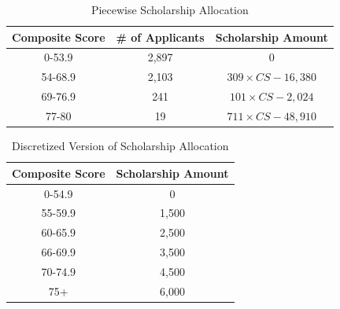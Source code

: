 \documentclass[12pt,english]{report}
\begin{document}
\begin{table}[ht]
\centering
\begin{tabular}{|c|c|c|}
\hline
Composite Score & \# of Applicants & Scholarship Amount \\ \hline
0-53.9         & 2,897	&0              \\ \hline
54-68.9        & 2,103  &$309\times CS -16,380 $            \\ \hline
69-76.9        &  241 &  $101\times CS - 2,024$           \\ \hline
77-80       & 19 &   $711 \times CS -48,910$          \\ \hline
\end{tabular}
\caption{Piecewise Scholarship Allocation}
\label{money_result}
\end{table}


\begin{table}[ht]
\centering
\begin{tabular}{|c|c|}
\hline
Composite Score & Scholarship Amount \\ \hline
0-54.9         & 0              \\ \hline
55-59.9         & 1,500              \\ \hline
60-65.9         & 2,500              \\ \hline
66-69.9         & 3,500              \\ \hline
70-74.9         & 4,500              \\ \hline
75+             & 6,000              \\ \hline
\end{tabular}
\caption{Discretized Version of Scholarship Allocation}
\label{money_result_discrete}

\end{table}
\end{document}
